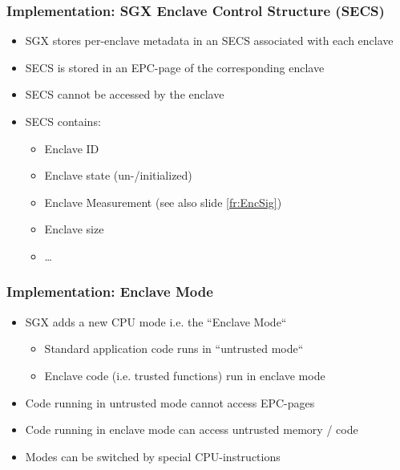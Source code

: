 \begin{frame}
    \frametitle{Implementation: SGX Enclave Control Structure (SECS)}
    \begin{itemize}[<+->]
        \item SGX stores per-enclave metadata in an SECS associated with each enclave
        \item SECS is stored in an EPC-page of the corresponding enclave
        \item SECS cannot be accessed by the enclave
        \item SECS contains:
        \begin{itemize}
            \item Enclave ID
            \item Enclave state (un-/initialized)
            \item Enclave Measurement (see also slide \ref{fr:EncSig})
            \item Enclave size
            \item \dots
        \end{itemize}
    \end{itemize}
\end{frame}

\begin{frame}
    \frametitle{Implementation: Enclave Mode}
    \begin{itemize}[<+->]
        \item SGX adds a new CPU mode i.e. the ``Enclave Mode``
        \begin{itemize}
            \item Standard application code runs in ``untrusted mode``
            \item Enclave code (i.e. trusted functions) run in enclave mode
        \end{itemize}
        \item Code running in untrusted mode cannot access EPC-pages
        \item Code running in enclave mode can access untrusted memory / code
        \item Modes can be switched by special CPU-instructions
    \end{itemize}
    $ $ \newline
    \centering
\end{frame}


